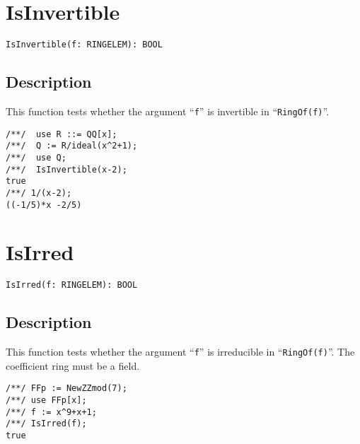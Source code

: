 \documentclass[a4paper]{mybook}
\newenvironment{command}{}{} %
\begin{document}
\section{IsInvertible}
\label{IsInvertible}
\begin{command} %


\begin{Verbatim}[label=syntax, rulecolor=\color{MidnightBlue},
frame=single]
IsInvertible(f: RINGELEM): BOOL
\end{Verbatim}


\subsection*{Description}

This function tests whether the argument ``\verb&f&'' is invertible in
``\verb&RingOf(f)&''.
\begin{Verbatim}[label=example, rulecolor=\color{PineGreen}, frame=single]
/**/  use R ::= QQ[x];
/**/  Q := R/ideal(x^2+1);
/**/  use Q;
/**/  IsInvertible(x-2);
true
/**/ 1/(x-2);
((-1/5)*x -2/5)
\end{Verbatim}


\end{command} %

\section{IsIrred}
\label{IsIrred}
\begin{command} %


\begin{Verbatim}[label=syntax, rulecolor=\color{MidnightBlue},
frame=single]
IsIrred(f: RINGELEM): BOOL
\end{Verbatim}


\subsection*{Description}

This function tests whether the argument ``\verb&f&'' is irreducible in
``\verb&RingOf(f)&''.  The coefficient ring must be a field.
\begin{Verbatim}[label=example, rulecolor=\color{PineGreen}, frame=single]
/**/ FFp := NewZZmod(7);
/**/ use FFp[x];
/**/ f := x^9+x+1;
/**/ IsIrred(f);
true
\end{Verbatim}


\end{command} %
\end{document}
